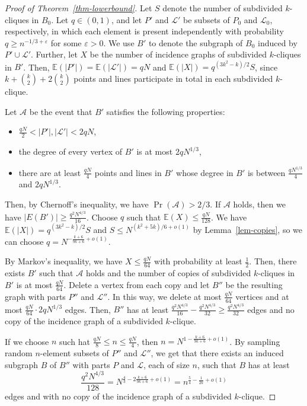 \documentclass{article}
\begin{document}
\begin{proof}[Proof of Theorem~\ref{thm-lowerbound}]
Let $S$ denote the number of subdivided $k$-cliques in $B_0$. 
Let $q\in (0,1)$, and let $P'$ and $\mathcal{L'}$ be subsets of $P_0$ and $\mathcal{L}_0$, respectively, in which each element is present independently with probability $q\geq n^{-1/3+\varepsilon}$ for some $\varepsilon > 0$.
We use $B'$ to denote the subgraph of $B_0$ induced by $P'\cup \mathcal{L}'$. 
Further, let $X$ be the number of incidence graphs of subdivided $k$-cliques in $B'$. 
Then, $\mathbb{E}(|P'|)=\mathbb{E}(|\mathcal{L}'|)=qN$ and $\mathbb{E}(|X|)=q^{(3k^2-k)/2}S$, since $k+\binom{k}{2}+2\binom{k}{2}$ points and lines participate in total in each subdivided $k$-clique.

Let $\mathcal{A}$ be the event that $B'$ satisfies the following properties:
\begin{itemize}
\item $\frac{qN}{2} < |P'|,|\mathcal{L}'| < 2qN$,
\item the degree of every vertex of $B'$ is at most $2qN^{1/3}$,
\item there are at least $\frac{qN}{4}$ points and lines in $B'$ whose degree in $B'$ is between $\frac{qN^{1/3}}{4}$ and $2qN^{1/3}$.
\end{itemize}

Then, by Chernoff's inequality, we have $\Pr(\mathcal{A})>2/3$. 
If $\mathcal{A}$ holds, then we have $|E(B')|\geq \frac{q^2N^{4/3}}{16}$. 
Choose $q$ such that $\mathbb{E}(X)\leq \frac{qN}{128}$. 
We have $\mathbb{E}(|X|)=q^{(3k^2-k)/2}S$ and $S\leq N^{(k^2+5k)/6+o(1)}$ by Lemma~\ref{lem-copies}, so we can choose $q=N^{-\frac{k+6}{9k+6}+o(1)}$.

By Markov's inequality, we have $X\leq \frac{qN}{64}$ with probability at least $\frac{1}{2}$. 
Then, there exists $B'$ such that $\mathcal{A}$ holds and the number of copies of subdivided $k$-cliques in $B'$ is at most $\frac{qN}{64}$. 
Delete a vertex from each copy and let $B''$ be the resulting graph with parts $P''$ and $\mathcal{L}''$. 
In this way, we delete at most $\frac{qN}{64}$ vertices and at most $\frac{qN}{64}\cdot 2qN^{1/3}$ edges.
Then, $B''$ has at least $\frac{q^2N^{4/3}}{16} - \frac{q^2N^{4/3}}{32} \geq\frac{q^2 N^{4/3}}{32}$ edges and no copy of the incidence graph of a subdivided $k$-clique.

If we choose $n$ such hat $\frac{qN}{8}\leq n\leq \frac{qN}{4}$, then $n=N^{1-\frac{k+6}{9k+6}+o(1)}$. 
By sampling random $n$-element subsets of $P''$ and $\mathcal{L}''$, we get that there exists an induced subgraph $B$ of $B''$ with parts $P$ and $\mathcal{L}$, each of size $n$, such that $B$ has at least 
\[\frac{q^2N^{4/3}}{128}=N^{\frac{4}{3}-2\frac{k+6}{9k+6}+o(1)}=n^{\frac{5}{4}-\frac{1}{2k}+o(1)} \]
edges and with no copy of the incidence graph of a subdivided $k$-clique.
\end{proof}




\end{document}
